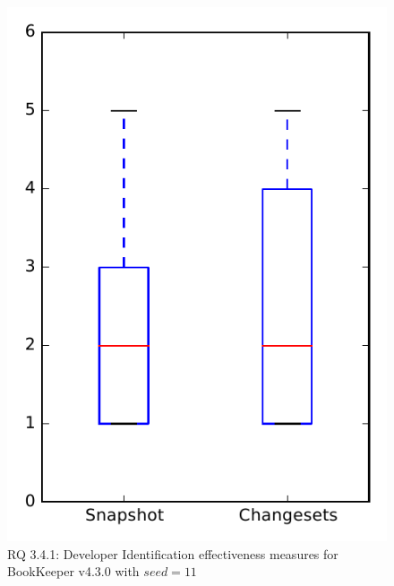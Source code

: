 
\begin{figure}
\centering
\includegraphics[height=0.4\textheight]{figures/dit_seed/rq1_bookkeeper_11}
\caption{RQ 3.4.1: Developer Identification effectiveness measures for BookKeeper v4.3.0 with $seed=11$}
\label{fig:dit_seed:rq1:bookkeeper}
\end{figure}
